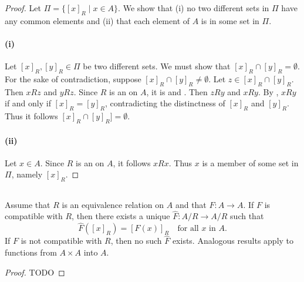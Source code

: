 \documentclass{report}
\begin{document}
\begin{proof}

  Let $\Pi = \{[x]_R \mid x \in A\}$.
  We show that (i) no two different sets in $\Pi$ have any common elements and
    (ii) that each element of $A$ is in some set in $\Pi$.

  \paragraph{(i)}%

    Let $[x]_R, [y]_R \in \Pi$ be two different sets.
    We must show that $[x]_R \cap [y]_R = \emptyset$.
    For the sake of contradiction, suppose $[x]_R \cap [y]_R \neq \emptyset$.
    Let $z \in [x]_R \cap [y]_R$.
    Then $xRz$ and $yRz$.
    Since $R$ is an  on $A$, it is
       and .
    Then $zRy$ and $xRy$.
    By , $xRy$ if and only if $[x]_R = [y]_R$,
      contradicting the distinctness of $[x]_R$ and $[y]_R$.
    Thus it follows $[x]_R \cap [y]_R] = \emptyset$.

  \paragraph{(ii)}%

    Let $x \in A$.
    Since $R$ is an  on $A$, it follows
      $xRx$.
    Thus $x$ is a member of some set in $\Pi$, namely $[x]_R$.

\end{proof}

\subsection{}%
\label{sub:theorem-3q}

\begin{theorem}[3Q]

  Assume that $R$ is an equivalence relation on $A$ and that
    $F \colon A \rightarrow A$.
  If $F$ is compatible with $R$, then there exists a unique
    $\hat{F} \colon A / R \rightarrow A / R$ such that
    $$\hat{F}([x]_R) = [F(x)]_R \quad\text{for all } x \text{ in } A.$$
  If $F$ is not compatible with $R$, then no such $\hat{F}$ exists.
  Analogous results apply to functions from $A \times A$ into $A$.

\end{theorem}

\begin{proof}

  TODO

\end{proof}
\end{document}
